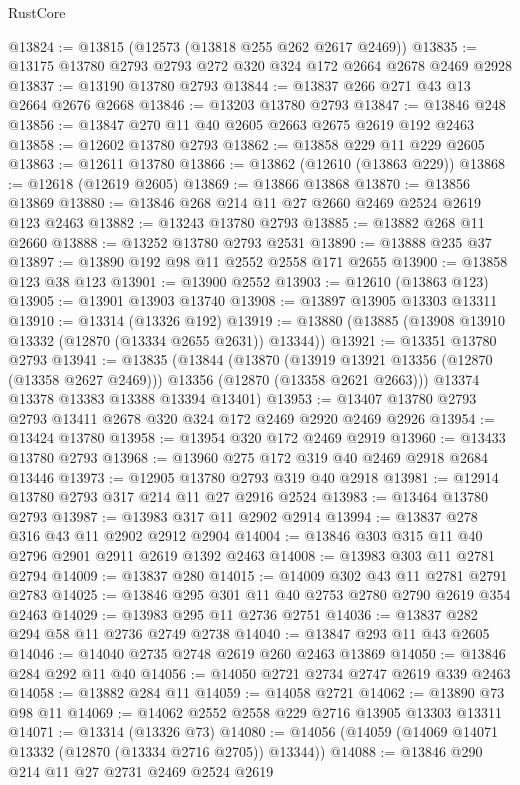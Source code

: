 \begin{lexlean}{RustCore}
\begin{coremodule}
@13824 := @13815 (@12573 (@13818 @255 @262 @2617 @2469))
@13835 := @13175 @13780 @2793 @2793 @272 @320 @324 @172 @2664 @2678 @2469 @2928
@13837 := @13190 @13780 @2793
@13844 := @13837 @266 @271 @43 @13 @2664 @2676 @2668
@13846 := @13203 @13780 @2793
@13847 := @13846 @248
@13856 := @13847 @270 @11 @40 @2605 @2663 @2675 @2619 @192 @2463
@13858 := @12602 @13780 @2793
@13862 := @13858 @229 @11 @229 @2605
@13863 := @12611 @13780
@13866 := @13862 (@12610 (@13863 @229))
@13868 := @12618 (@12619 @2605)
@13869 := @13866 @13868
@13870 := @13856 @13869
@13880 := @13846 @268 @214 @11 @27 @2660 @2469 @2524 @2619 @123 @2463
@13882 := @13243 @13780 @2793
@13885 := @13882 @268 @11 @2660
@13888 := @13252 @13780 @2793 @2531
@13890 := @13888 @235 @37
@13897 := @13890 @192 @98 @11 @2552 @2558 @171 @2655
@13900 := @13858 @123 @38 @123
@13901 := @13900 @2552
@13903 := @12610 (@13863 @123)
@13905 := @13901 @13903 @13740
@13908 := @13897 @13905 @13303 @13311
@13910 := @13314 (@13326 @192)
@13919 := @13880 (@13885 (@13908 @13910 @13332 (@12870 (@13334 @2655 @2631)) @13344))
@13921 := @13351 @13780 @2793
@13941 := @13835
    (@13844
      (@13870
        (@13919 @13921 @13356 (@12870 (@13358 @2627 @2469)))
        @13356
        (@12870 (@13358 @2621 @2663)))
      @13374
      @13378
      @13383
      @13388
      @13394
      @13401)
@13953 := @13407 @13780 @2793 @2793 @13411 @2678 @320 @324 @172 @2469 @2920 @2469 @2926
@13954 := @13424 @13780
@13958 := @13954 @320 @172 @2469 @2919
@13960 := @13433 @13780 @2793
@13968 := @13960 @275 @172 @319 @40 @2469 @2918 @2684 @13446
@13973 := @12905 @13780 @2793 @319 @40 @2918
@13981 := @12914 @13780 @2793 @317 @214 @11 @27 @2916 @2524
@13983 := @13464 @13780 @2793
@13987 := @13983 @317 @11 @2902 @2914
@13994 := @13837 @278 @316 @43 @11 @2902 @2912 @2904
@14004 := @13846 @303 @315 @11 @40 @2796 @2901 @2911 @2619 @1392 @2463
@14008 := @13983 @303 @11 @2781 @2794
@14009 := @13837 @280
@14015 := @14009 @302 @43 @11 @2781 @2791 @2783
@14025 := @13846 @295 @301 @11 @40 @2753 @2780 @2790 @2619 @354 @2463
@14029 := @13983 @295 @11 @2736 @2751
@14036 := @13837 @282 @294 @58 @11 @2736 @2749 @2738
@14040 := @13847 @293 @11 @43 @2605
@14046 := @14040 @2735 @2748 @2619 @260 @2463 @13869
@14050 := @13846 @284 @292 @11 @40
@14056 := @14050 @2721 @2734 @2747 @2619 @339 @2463
@14058 := @13882 @284 @11
@14059 := @14058 @2721
@14062 := @13890 @73 @98 @11
@14069 := @14062 @2552 @2558 @229 @2716 @13905 @13303 @13311
@14071 := @13314 (@13326 @73)
@14080 := @14056 (@14059 (@14069 @14071 @13332 (@12870 (@13334 @2716 @2705)) @13344))
@14088 := @13846 @290 @214 @11 @27 @2731 @2469 @2524 @2619

\end{coremodule}
\end{lexlean}
